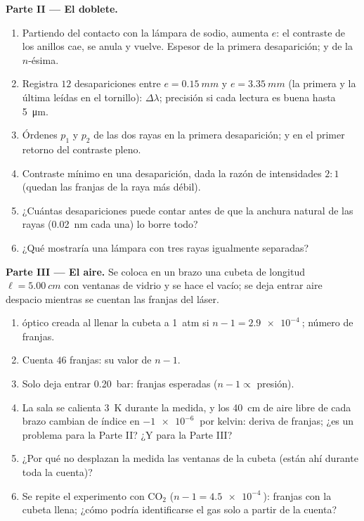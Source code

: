\begin{problem}
\medskip
\noindent\textbf{Parte II --- El doblete.}
\begin{enumerate}[resume]
  \item Partiendo del contacto con la lámpara de sodio, aumenta $e$:
        el contraste de los anillos cae, se anula y vuelve. Espesor de la
        primera desaparición; y de la $n$-ésima.
  \item Registra $12$ desapariciones entre $e = \qty{0.15}{mm}$ y
        $e = \qty{3.35}{mm}$ (la primera y la última leídas en el tornillo):
        $\Delta\lambda$; precisión si cada lectura es buena hasta \qty{5}{\micro m}.
  \item Órdenes $p_1$ y $p_2$ de las dos rayas en la primera
        desaparición; y en el primer retorno del contraste pleno.
  \item Contraste mínimo en una desaparición, dada la razón de
        intensidades $2 : 1$ (quedan las franjas de la raya más débil).
  \item ¿Cuántas desapariciones puede contar antes de que la anchura
        natural de las rayas (\qty{0.02}{nm} cada una) lo borre todo?
  \item ¿Qué mostraría una lámpara con tres rayas igualmente separadas?
\end{enumerate}

\medskip
\noindent\textbf{Parte III --- El aire.}
Se coloca en un brazo una cubeta de longitud $\ell = \qty{5.00}{cm}$ con ventanas de vidrio
y se hace el vacío; se deja entrar aire despacio mientras se cuentan las franjas
del láser.
\begin{enumerate}[resume]
  \item {} óptico creada al llenar la cubeta a
        \qty{1}{atm} si $n - 1 = \qty{2.9e-4}{}$; número de franjas.
  \item Cuenta $46$ franjas: su valor de $n - 1$.
  \item Solo deja entrar \qty{0.20}{bar}: franjas esperadas ($n - 1 \propto$
        presión).
  \item La sala se calienta \qty{3}{K} durante la medida, y los
        \qty{40}{cm} de aire libre de cada brazo cambian de índice en
        $-\qty{1e-6}{}$ por kelvin: deriva de franjas; ¿es un problema para
        la Parte II? ¿Y para la Parte III?
  \item ¿Por qué no desplazan la medida las ventanas de la cubeta (están
        ahí durante toda la cuenta)?
  \item Se repite el experimento con CO$_2$ ($n - 1 = \qty{4.5e-4}{}$):
        franjas con la cubeta llena; ¿cómo podría identificarse el gas solo
        a partir de la cuenta?
\end{enumerate}


\end{problem}

